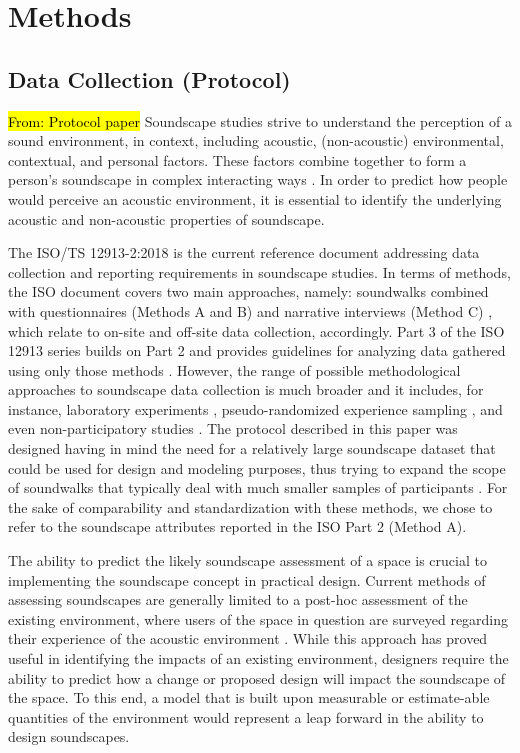 \chapter{Methods}
\label{ch:methods}

\section{Data Collection (Protocol)}
 \hl{From: Protocol paper}
 Soundscape studies strive to understand the perception of a sound environment, in context, including acoustic, (non-acoustic) environmental, contextual, and personal factors. These factors combine together to form a person's soundscape in complex interacting ways \citep{Berglund2006Tool}. In order to predict how people would perceive an acoustic environment, it is essential to identify the underlying acoustic and non-acoustic properties of soundscape.

 The ISO/TS 12913-2:2018 is the current reference document addressing data collection and reporting requirements in soundscape studies. In terms of methods, the ISO document covers two main approaches, namely: soundwalks combined with questionnaires (Methods A and B) and narrative interviews (Method C) \citep{ISO12913_2_2018IOS}, which relate to on-site and off-site data collection, accordingly. Part 3 of the ISO 12913 series builds on Part 2 and provides guidelines for analyzing data gathered using only those methods \citep{ISO12913_3_2019IOS}. However, the range of possible methodological approaches to soundscape data collection is much broader and it includes, for instance, laboratory experiments \citep{Aletta2016Soundscape,Sun2019Classification,Oberman2018Towards}, pseudo-randomized experience sampling \citep{Craig2017Experience}, and even non-participatory studies \citep{Lavia2018Non}. The protocol described in this paper was designed having in mind the need for a relatively large soundscape dataset that could be used for design and modeling purposes, thus trying to expand the scope of soundwalks that typically deal with much smaller samples of participants \citep{Engel2018Review}. For the sake of comparability and standardization with these methods, we chose to refer to the soundscape attributes reported in the ISO Part 2 (Method A).


 The ability to predict the likely soundscape assessment of a space is crucial to implementing the soundscape concept in practical design. Current methods of assessing soundscapes are generally limited to a post-hoc assessment of the existing environment, where users of the space in question are surveyed regarding their experience of the acoustic environment \citep{Engel2018Review, Zhang2018Effect}. While this approach has proved useful in identifying the impacts of an existing environment, designers require the ability to predict how a change or proposed design will impact the soundscape of the space. To this end, a model that is built upon measurable or estimate-able quantities of the environment would represent a leap forward in the ability to design soundscapes.

